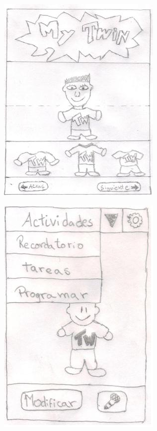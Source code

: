 \documentclass[10pt]{article}
\begin{document}
{\begin{flushleft}
\hspace{0.2in}\includegraphics[scale=0.75]{Twin2}\vspace{0.2in}
\begin{center}
\includegraphics[scale=0.6]{Twin3}
\end{center}


\end{flushleft}


\newpage
\begin{flushleft}

\end{flushleft}}
\end{document}
